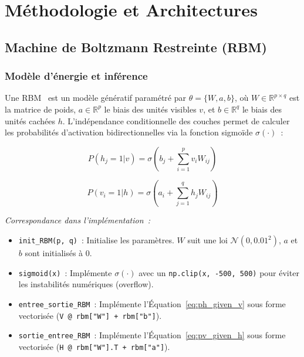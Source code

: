 \documentclass[11pt,a4paper]{article}
\renewcommand{\texttt}[1]{\urlstyle{tt}\nolinkurl{#1}}
\begin{document}
\section{M\'ethodologie et Architectures}
\label{sec:methodo}

\subsection{Machine de Boltzmann Restreinte (RBM)}
\label{sec:rbm_theory}

\subsubsection{Mod\`ele d'\'energie et inf\'erence}

Une RBM~\cite{smolensky1986} est un mod\`ele g\'en\'eratif param\'etr\'e par $\theta = \{W, a, b\}$, o\`u $W \in \mathbb{R}^{p \times q}$ est la matrice de poids, $a \in \mathbb{R}^p$ le biais des unit\'es visibles $v$, et $b \in \mathbb{R}^q$ le biais des unit\'es cach\'ees $h$. L'ind\'ependance conditionnelle des couches permet de calculer les probabilit\'es d'activation bidirectionnelles via la fonction sigmo\"ide $\sigma(\cdot)$~:

\begin{equation}
P(h_j = 1 | v) = \sigma\left(b_j + \sum_{i=1}^{p} v_i W_{ij}\right)
\label{eq:ph_given_v}
\end{equation}

\begin{equation}
P(v_i = 1 | h) = \sigma\left(a_i + \sum_{j=1}^{q} h_j W_{ij}\right)
\label{eq:pv_given_h}
\end{equation}

\noindent\textit{Correspondance dans l'impl\'ementation~:}
\begin{itemize}
    \item \texttt{init\_RBM(p, q)}~: Initialise les param\`etres. $W$ suit une loi $\mathcal{N}(0, 0.01^2)$, $a$ et $b$ sont initialis\'es \`a 0.
    \item \texttt{sigmoid(x)}~: Impl\'emente $\sigma(\cdot)$ avec un \texttt{np.clip(x, -500, 500)} pour \'eviter les instabilit\'es num\'eriques (overflow).
    \item \texttt{entree\_sortie\_RBM}~: Impl\'emente l'\'Equation~\ref{eq:ph_given_v} sous forme vectoris\'ee (\texttt{V @ rbm["W"] + rbm["b"]}).
    \item \texttt{sortie\_entree\_RBM}~: Impl\'emente l'\'Equation~\ref{eq:pv_given_h} sous forme vectoris\'ee (\texttt{H @ rbm["W"].T + rbm["a"]}).
\end{itemize}
\end{document}
